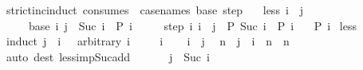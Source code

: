 \begin{isabellebody}
%
\endisatagproof
{\isafoldproof}%
%
\isadelimproof
\isanewline
%
\endisadelimproof
\isanewline
{}\isamarkupfalse%
\ strict{\isacharunderscore}{\kern0pt}inc{\isacharunderscore}{\kern0pt}induct\ {\isacharbrackleft}{\kern0pt}consumes\ {}{\isacharcomma}{\kern0pt}\ case{\isacharunderscore}{\kern0pt}names\ base\ step{\isacharbrackright}{\kern0pt}{\isacharcolon}{\kern0pt}\isanewline
\ \ \ less{\isacharcolon}{\kern0pt}\ {\isachardoublequoteopen}i\ {\isacharless}{\kern0pt}\ j{\isachardoublequoteclose}\isanewline
\ \ \ \ \ base{\isacharcolon}{\kern0pt}\ {\isachardoublequoteopen}{\isasymAnd}i{\isachardot}{\kern0pt}\ j\ {\isacharequal}{\kern0pt}\ Suc\ i\ {\isasymLongrightarrow}\ P\ i{\isachardoublequoteclose}\isanewline
\ \ \ \ \ step{\isacharcolon}{\kern0pt}\ {\isachardoublequoteopen}{\isasymAnd}i{\isachardot}{\kern0pt}\ i\ {\isacharless}{\kern0pt}\ j\ {\isasymLongrightarrow}\ P\ {\isacharparenleft}{\kern0pt}Suc\ i{\isacharparenright}{\kern0pt}\ {\isasymLongrightarrow}\ P\ i{\isachardoublequoteclose}\isanewline
\ \ \ {\isachardoublequoteopen}P\ i{\isachardoublequoteclose}\isanewline
%
\isadelimproof
%
\endisadelimproof
%
\isatagproof
{}\isamarkupfalse%
\ less\ \isamarkupfalse%
\ {\isacharparenleft}{\kern0pt}induct\ {\isachardoublequoteopen}j\ {\isacharminus}{\kern0pt}\ i\ {\isacharminus}{\kern0pt}\ {}{\isachardoublequoteclose}\ arbitrary{\isacharcolon}{\kern0pt}\ i{\isacharparenright}{\kern0pt}\isanewline
\ \ \isamarkupfalse%
\ {\isacharparenleft}{\kern0pt}{}\ i{\isacharparenright}{\kern0pt}\isanewline
\ \ \isamarkupfalse%
\ {\isacartoucheopen}i\ {\isacharless}{\kern0pt}\ j{\isacartoucheclose}\ \isamarkupfalse%
\ n\ \ {\isachardoublequoteopen}j\ {\isacharequal}{\kern0pt}\ i\ {\isacharplus}{\kern0pt}\ n{\isachardoublequoteclose}\ \ {\isachardoublequoteopen}n\ {\isachargreater}{\kern0pt}\ {}{\isachardoublequoteclose}\isanewline
\ \ \ \ \isamarkupfalse%
\ {\isacharparenleft}{\kern0pt}auto\ dest{\isacharbang}{\kern0pt}{\isacharcolon}{\kern0pt}\ less{\isacharunderscore}{\kern0pt}imp{\isacharunderscore}{\kern0pt}Suc{\isacharunderscore}{\kern0pt}add{\isacharparenright}{\kern0pt}\isanewline
\ \ \isamarkupfalse%
\ {}\ \isamarkupfalse%
\ {\isachardoublequoteopen}j\ {\isacharequal}{\kern0pt}\ Suc\ i{\isachardoublequoteclose}\isanewline
\ \ \ \ \isamarkupfalse%

\end{isabellebody}
